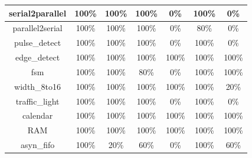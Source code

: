 \begin{tabular}{c|cc|cc|cc}
serial2parallel & \color{black} {\cellcolor{lightblue}} 100\% & \color{black} {\cellcolor{lightgreen}} 100\% & \color{black} {\cellcolor{lightblue}} 100\% & 0\% & \color{black} {\cellcolor{lightblue}} 100\% & 0\% \\ \midrule
parallel2serial & \color{black} {\cellcolor{lightblue}} 100\% & \color{black} {\cellcolor{lightgreen}} 100\% & \color{black} {\cellcolor{lightblue}} 100\% & 0\% & 80\% & 0\% \\ \midrule
pulse\_detect & \color{black} {\cellcolor{lightblue}} 100\% & \color{black} {\cellcolor{lightgreen}} 100\% & \color{black} {\cellcolor{lightblue}} 100\% & 0\% & \color{black} {\cellcolor{lightblue}} 100\% & 0\% \\ \midrule
edge\_detect & \color{black} {\cellcolor{lightblue}} 100\% & \color{black} {\cellcolor{lightgreen}} 100\% & \color{black} {\cellcolor{lightblue}} 100\% & \color{black} {\cellcolor{lightgreen}} 100\% & \color{black} {\cellcolor{lightblue}} 100\% & \color{black} {\cellcolor{lightgreen}} 100\% \\ \midrule
fsm & \color{black} {\cellcolor{lightblue}} 100\% & \color{black} {\cellcolor{lightgreen}} 100\% & 80\% & 0\% & \color{black} {\cellcolor{lightblue}} 100\% & \color{black} {\cellcolor{lightgreen}} 100\% \\ \midrule
width\_8to16 & \color{black} {\cellcolor{lightblue}} 100\% & \color{black} {\cellcolor{lightgreen}} 100\% & \color{black} {\cellcolor{lightblue}} 100\% & \color{black} {\cellcolor{lightgreen}} 100\% & \color{black} {\cellcolor{lightblue}} 100\% & 20\% \\ \midrule
traffic\_light & \color{black} {\cellcolor{lightblue}} 100\% & \color{black} {\cellcolor{lightgreen}} 100\% & \color{black} {\cellcolor{lightblue}} 100\% & 0\% & \color{black} {\cellcolor{lightblue}} 100\% & 0\% \\ \midrule
calendar & \color{black} {\cellcolor{lightblue}} 100\% & \color{black} {\cellcolor{lightgreen}} 100\% & \color{black} {\cellcolor{lightblue}} 100\% & \color{black} {\cellcolor{lightgreen}} 100\% & \color{black} {\cellcolor{lightblue}} 100\% & \color{black} {\cellcolor{lightgreen}} 100\% \\ \midrule
RAM & \color{black} {\cellcolor{lightblue}} 100\% & \color{black} {\cellcolor{lightgreen}} 100\% & \color{black} {\cellcolor{lightblue}} 100\% & \color{black} {\cellcolor{lightgreen}} 100\% & \color{black} {\cellcolor{lightblue}} 100\% & \color{black} {\cellcolor{lightgreen}} 100\% \\ \midrule
asyn\_fifo & \color{black} {\cellcolor{lightblue}} 100\% & 20\% & 60\% & 0\% & \color{black} {\cellcolor{lightblue}} 100\% & \color{black} {\cellcolor{lightgreen}} 60\% \\ \midrule

\end{tabular}
